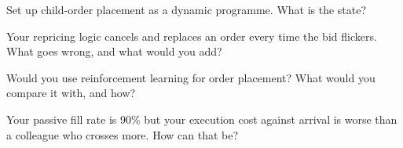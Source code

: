 \begin{interviewq}\label{iq:mx:child-order-placement:3}
Set up child-order placement as a dynamic programme. What is the state?
\end{interviewq}

\begin{interviewq}\label{iq:mx:child-order-placement:4}
Your repricing logic cancels and replaces an order every time the bid flickers. What goes wrong, and what would you add?
\end{interviewq}

\begin{interviewq}\label{iq:mx:child-order-placement:5}
Would you use reinforcement learning for order placement? What would you compare it with, and how?
\end{interviewq}

\begin{interviewq}\label{iq:mx:child-order-placement:6}
Your passive fill rate is 90\% but your execution cost against arrival is worse than a colleague who crosses more. How can that be?
\end{interviewq}
